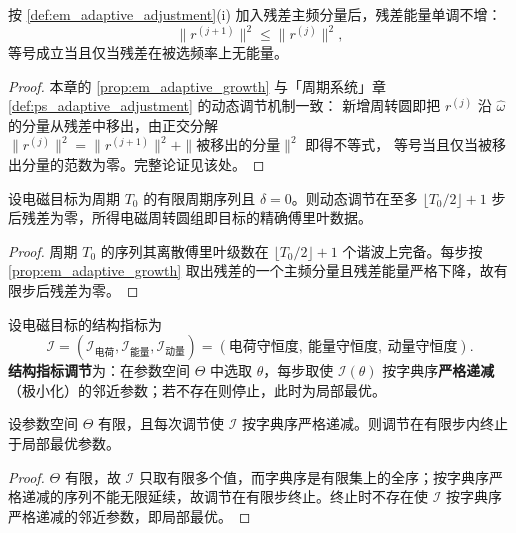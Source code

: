\begin{proposition}[数量调节的单调性]\label{prop:em_adaptive_growth}
按 \cref{def:em_adaptive_adjustment}(i) 加入残差主频分量后，残差能量单调不增：
\[
\|r^{(j+1)}\|^2\le\|r^{(j)}\|^2,
\]
等号成立当且仅当残差在被选频率上无能量。
\end{proposition}

\begin{proof}
本章的 \cref{prop:em_adaptive_growth} 与「周期系统」章 \cref{def:ps_adaptive_adjustment} 的动态调节机制一致：
新增周转圆即把 $r^{(j)}$ 沿 $\hat\omega$ 的分量从残差中移出，由正交分解
$\|r^{(j)}\|^2=\|r^{(j+1)}\|^2+\|\text{被移出的分量}\|^2$ 即得不等式，
等号当且仅当被移出分量的范数为零。完整论证见该处。
\end{proof}

\begin{theorem}[动态调节的收敛性]\label{thm:em_adaptive_convergence}
设电磁目标为周期 $T_0$ 的有限周期序列且 $\delta=0$。则动态调节在至多 $\lfloor T_0/2\rfloor+1$ 步后残差为零，所得电磁周转圆组即目标的精确傅里叶数据。
\end{theorem}

\begin{proof}
周期 $T_0$ 的序列其离散傅里叶级数在 $\lfloor T_0/2\rfloor+1$ 个谐波上完备。每步按 \cref{prop:em_adaptive_growth} 取出残差的一个主频分量且残差能量严格下降，故有限步后残差为零。
\end{proof}

\begin{definition}[结构指标调节]\label{def:em_structure_metric_adjustment}
设电磁目标的结构指标为
\[
\mathcal I=(\mathcal I_{\text{电荷}},\mathcal I_{\text{能量}},\mathcal I_{\text{动量}})
=(\text{电荷守恒度},\ \text{能量守恒度},\ \text{动量守恒度}).
\]
\textbf{结构指标调节}为：在参数空间 $\Theta$ 中选取 $\theta$，每步取使 $\mathcal I(\theta)$ 按字典序\textbf{严格递减}（极小化）的邻近参数；若不存在则停止，此时为局部最优。
\end{definition}

\begin{proposition}[结构指标调节的有限收敛]\label{prop:em_structure_metric_convergence}
设参数空间 $\Theta$ 有限，且每次调节使 $\mathcal I$ 按字典序严格递减。则调节在有限步内终止于局部最优参数。
\end{proposition}

\begin{proof}
$\Theta$ 有限，故 $\mathcal I$ 只取有限多个值，而字典序是有限集上的全序；按字典序严格递减的序列不能无限延续，故调节在有限步终止。终止时不存在使 $\mathcal I$ 按字典序严格递减的邻近参数，即局部最优。
\end{proof}

